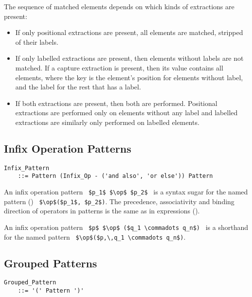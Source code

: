 The sequence of matched elements depends on which kinds of extractions are present:
\begin{itemize}
  \item If only positional extractions are present, all elements are matched, stripped of their labels. 
  \item If only labelled extractions are present, then elements without labels are not matched. If a capture extraction is present, then its value contains all elements, where the key is the element's position for elements without label, and the label for the rest that has a label. 
  \item If both extractions are present, then both are performed. Positional extractions are performed only on elements without any label and labelled extractions are similarly only performed on labelled elements. 
\end{itemize}





\subsection{Infix Operation Patterns}
\label{sec:infix-patterns}

\grammar\begin{lstlisting}
Infix_Pattern 
    ::= Pattern (Infix_Op - ('and also', 'or else')) Pattern
\end{lstlisting}

An infix operation pattern ~\lstinline!$p_1$ $\op$ $p_2$!~ is a syntax sugar for the named pattern () ~\lstinline!$\op$($p_1$, $p_2$)!. The precedence, associativity and binding direction of operators in patterns is the same as in expressions ().

An infix operation pattern ~\lstinline!$p$ $\op$ ($q_1 \commadots q_n$)!~ is a shorthand for the named pattern ~\lstinline!$\op$($p,\,q_1 \commadots q_n$)!.





\subsection{Grouped Patterns}
\label{sec:grouped-patterns}

\grammar\begin{lstlisting}
Grouped_Pattern 
    ::= '(' Pattern ')'
\end{lstlisting}

